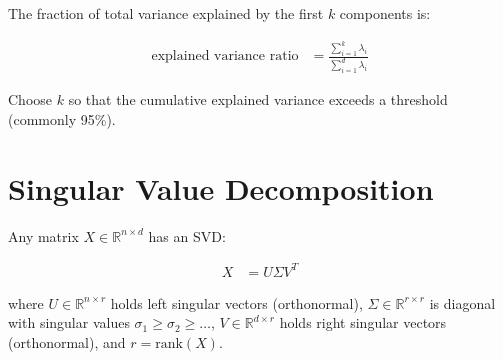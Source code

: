 The fraction of total variance explained by the first $k$ components is:

\begin{align*}
    \text{explained variance ratio} &= \frac{\sum_{i=1}^k \lambda_i}{\sum_{i=1}^d \lambda_i}
\end{align*}

Choose $k$ so that the cumulative explained variance exceeds a threshold (commonly 95\%).

\begin{marginfigure}
\centering
{}
\caption{Cumulative explained variance. The dashed line marks the 95\% threshold; six components suffice here.}
\label{fig:explained_variance}
\end{marginfigure}


\section{Singular Value Decomposition}


Any matrix $X \in \mathbb{R}^{n \times d}$ has an SVD:

\begin{align*}
    X &= U \Sigma V^T
\end{align*}

where $U \in \mathbb{R}^{n \times r}$ holds left singular vectors (orthonormal), $\Sigma \in \mathbb{R}^{r \times r}$ is diagonal with singular values $\sigma_1 \geq \sigma_2 \geq \ldots$, $V \in \mathbb{R}^{d \times r}$ holds right singular vectors (orthonormal), and $r{=}\text{rank}(X)$.

